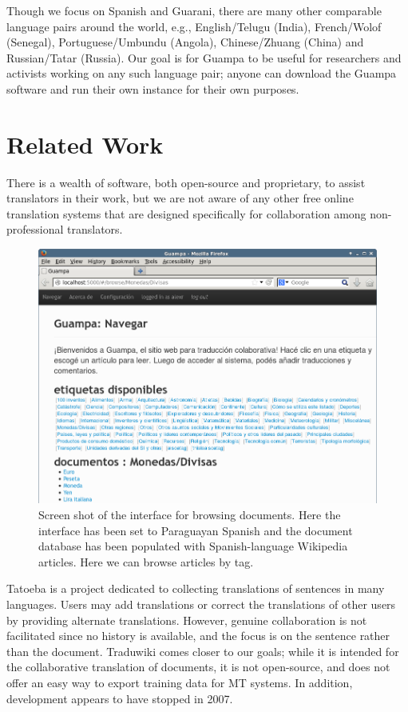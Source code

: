 \documentclass[10pt, a4paper]{article}
\begin{document}
Though we focus on Spanish and Guarani, there are many other comparable
language pairs around the world, e.g., English/Telugu (India), French/Wolof
(Senegal), Portuguese/Umbundu (Angola), Chinese/Zhuang (China) and
Russian/Tatar (Russia). Our goal is for Guampa to be useful for researchers and
activists working on any such language pair; anyone can download the Guampa
software and run their own instance for their own purposes.

\section{Related Work}
There is a wealth of software, both open-source and proprietary, to assist
translators in their work, but we are not aware of any other free online
translation systems that are designed specifically for collaboration among
non-professional translators.

\begin{figure}
  \begin{center}
\includegraphics[width=12cm]{guampa-browse-cropped-updated}
  \end{center}
\caption{Screen shot of the interface for browsing documents. Here the
interface has been set to Paraguayan Spanish and the document database has been
populated with Spanish-language Wikipedia articles. Here we can browse articles
by tag.}
\end{figure}

Tatoeba \cite{tatoeba} is a
project dedicated to collecting translations of sentences in many languages.
Users may add translations or correct the translations of other users by
providing alternate translations. However, genuine collaboration is not
facilitated since no history is available, and the focus is on the sentence
rather than the document. Traduwiki \cite{traduwiki} comes closer
to our goals; while it is intended for the collaborative translation of
documents, it is not open-source, and does not offer an easy way to export
training data for MT systems. In addition, development appears
to have stopped in 2007.
\end{document}
